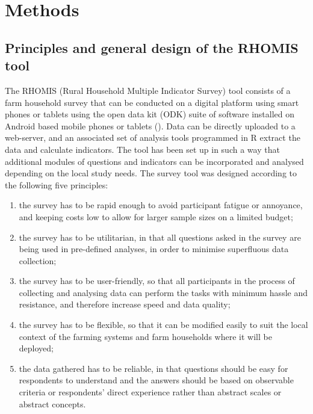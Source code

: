 \section{Methods}

\subsection{Principles and general design of the RHOMIS tool}

The RHOMIS (Rural Household Multiple Indicator Survey) tool consists of a farm household survey that can be conducted on a digital platform using smart phones or tablets using the open data kit (ODK) suite  of software installed on Android based mobile phones or tablets (\citealp{Hartung2010}). Data can be directly uploaded to a web-server, and an associated set of analysis tools programmed in R extract the data and calculate indicators. The tool has been set up in such a way that additional modules of questions and indicators can be incorporated and analysed depending on the local study needs. The survey tool was designed according to the following ﬁve principles:
\begin{enumerate}[label=\roman*.]
\item the survey has to be rapid enough to avoid participant fatigue or annoyance, and keeping costs low to allow for larger sample sizes on a limited budget;
\item the survey has to be utilitarian, in that all questions asked in the survey are being used in pre-deﬁned analyses, in order to minimise superﬂuous data collection;
\item the survey has to be user-friendly, so that all participants in the process of collecting and analysing data can perform the tasks with minimum hassle and resistance, and therefore increase speed and data quality;
\item the survey has to be ﬂexible, so that it can be modiﬁed easily to suit the local context of the farming systems and farm households where it will be deployed;
\item the data gathered has to be reliable, in that questions should be easy for respondents to understand and the answers should be based on observable criteria or respondents' direct experience rather than abstract scales or abstract concepts.
\end{enumerate}

